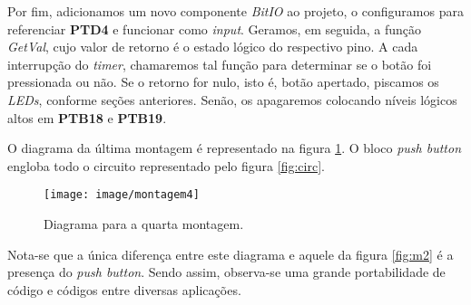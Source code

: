 Por fim, adicionamos um novo componente \textit{BitIO} ao projeto, o
configuramos para referenciar \textbf{PTD4} e funcionar como \textit{input}.
Geramos, em seguida, a função \textit{GetVal}, cujo valor de retorno é o estado
lógico do respectivo pino. A cada interrupção do \textit{timer}, chamaremos tal
função para determinar se o botão foi pressionada ou não. Se o retorno for nulo,
isto é, botão apertado, piscamos os \textit{LEDs}, conforme seções anteriores.
Senão, os apagaremos colocando níveis lógicos altos em \textbf{PTB18} e
\textbf{PTB19}.

\vspace{12pt}

O diagrama da última montagem é representado na figura \ref{fig:m4}. O bloco
\textit{push button} engloba todo o circuito representado pelo figura
\ref{fig:circ}.

\FloatBarrier

\begin{figure}[h]
    \centering
    \texttt{[image: image/montagem4]}
    
    \caption{Diagrama para a quarta montagem.}
    \label{fig:m4}
\end{figure} 

\FloatBarrier

Nota-se que a única diferença entre este diagrama e aquele da figura
\ref{fig:m2} é a presença do \textit{push button}. Sendo assim, observa-se uma
grande portabilidade de código e códigos entre diversas aplicações. 
